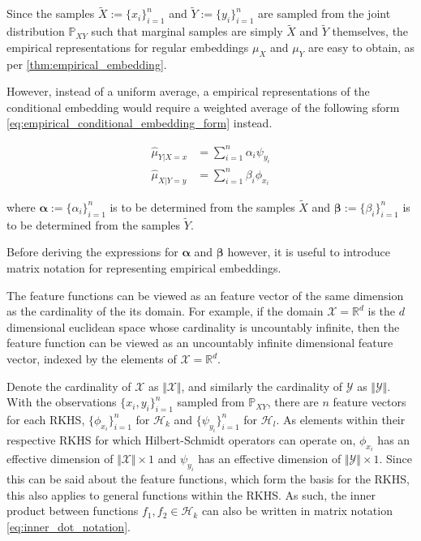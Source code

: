 \documentclass[twoside]{article} \usepackage{aistats2017}
\theoremstyle{definition}
\newcommand{\rv}[1]{{#1}}
\newcommand{\ds}[1]{\tilde{#1}}
\newcommand{\Hk}{\mathcal{H}_{k}}
\newcommand{\Hl}{\mathcal{H}_{l}}
\newcommand{\muX}{\mu_{\rv{X}}}
\newcommand{\muY}{\mu_{\rv{Y}}}
\newcommand{\hatmuYx}{\hat{\mu}_{\rv{Y} | \rv{X} = x}}
\newcommand{\hatmuXy}{\hat{\mu}_{\rv{X} | \rv{Y} = y}}
\newcommand{\cardX}{\Vert \mathcal{X} \Vert}
\newcommand{\cardY}{\Vert \mathcal{Y} \Vert}
\begin{document}
		Since the samples $\ds{X} := \{x_{i}\}_{i = 1}^{n}$ and $\ds{Y} := \{y_{i}\}_{i = 1}^{n}$ are sampled from the joint distribution $\mathbb{P}_{\rv{X} \rv{Y}}$ such that marginal samples are simply $\ds{X}$ and $\ds{Y}$ themselves, the empirical representations for regular embeddings $\muX$ and $\muY$ are easy to obtain, as per \cref{thm:empirical_embedding}.
		
		However, instead of a uniform average, a empirical representations of the conditional embedding would require a weighted average of the following sform \eqref{eq:empirical_conditional_embedding_form} instead.
		
		\begin{equation}
		\begin{aligned}
			\hatmuYx &= \sum_{i = 1}^{n} \alpha_{i} \psi_{y_{i}} \\
			\hatmuXy &= \sum_{i = 1}^{n} \beta_{i} \phi_{x_{i}}
		\label{eq:empirical_conditional_embedding_form}
		\end{aligned}
		\end{equation}
		
		where $\bm{\alpha} := \{\alpha_{i}\}_{i = 1}^{n}$ is to be determined from the samples $\ds{X}$ and $\bm{\beta} := \{\beta_{i}\}_{i = 1}^{n}$ is to be determined from the samples $\ds{Y}$.
		
		Before deriving the expressions for $\bm{\alpha}$ and $\bm{\beta}$ however, it is useful to introduce matrix notation for representing empirical embeddings.
		
		The feature functions can be viewed as an feature vector of the same dimension as the cardinality of the its domain. For example, if the domain $\mathcal{X} = \mathbb{R}^{d}$ is the $d$ dimensional euclidean space whose cardinality is uncountably infinite, then the feature function can be viewed as an uncountably infinite dimensional feature vector, indexed by the elements of $\mathcal{X} = \mathbb{R}^{d}$.
		
		Denote the cardinality of $\mathcal{X}$ as $\cardX$, and similarly the cardinality of $\mathcal{Y}$ as $\cardY$. With the observations $\{x_{i}, y_{i}\}_{i = 1}^{n}$ sampled from $\mathbb{P}_{\rv{X} \rv{Y}}$, there are $n$ feature vectors for each RKHS, $\{\phi_{x_{i}}\}_{i = 1}^{n}$ for $\Hk$ and $\{\psi_{y_{i}}\}_{i = 1}^{n}$ for $\Hl$. As elements within their respective RKHS for which Hilbert-Schmidt operators can operate on, $\phi_{x_{i}}$ has an effective dimension of $\cardX \times 1$ and $\psi_{y_{i}}$ has an effective dimension of $\cardY \times 1$. Since this can be said about the feature functions, which form the basis for the RKHS, this also applies to general functions within the RKHS. As such, the inner product between functions $f_{1}, f_{2} \in \Hk$ can also be written in matrix notation \eqref{eq:inner_dot_notation}.
		
\end{document}
